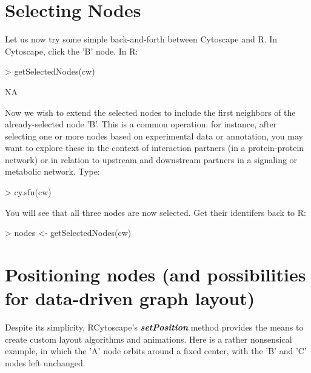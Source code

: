 \documentclass[12pt]{article}
\begin{document}
\section{Selecting Nodes}

Let us now try some simple back-and-forth between Cytoscape and R.  In Cytoscape, click the 'B' node.  In R:

\begin{Schunk}
\begin{Sinput}
> getSelectedNodes(cw)
\end{Sinput}
\begin{Soutput}
[1] NA
\end{Soutput}
\end{Schunk}

Now we wish to extend the selected nodes to include the first neighbors of the already-selected node 'B'.  This is a common operation: for instance, after selecting one or more nodes based on experimental data or annotation, you may want to explore these in the context of interaction partners (in a protein-protein network) or in relation to upstream and downstream partners in a signaling or metabolic network.  Type:

\begin{Schunk}
\begin{Sinput}
> cy.sfn(cw)
\end{Sinput}
\end{Schunk}

You will see that all three nodes are now selected.  Get their identifers back to R:

\begin{Schunk}
\begin{Sinput}
> nodes <- getSelectedNodes(cw)
\end{Sinput}
\end{Schunk}


\section{Positioning nodes (and possibilities for data-driven graph layout)}

Despite its simplicity, RCytoscape's \emph{\textbf{setPosition}} method provides the means to create custom layout algorithms and animations.  Here is a rather nonsensical example, in which the 'A' node orbits around a fixed center, with the 'B' and 'C' nodes left unchanged.
\end{document}
